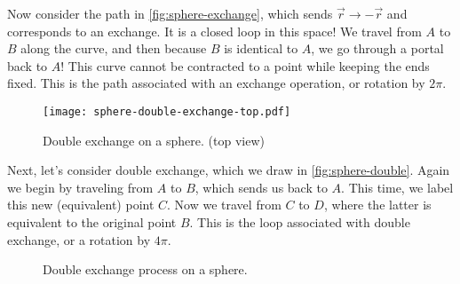 \documentclass[12pt, english]{book}
\begin{document}
Now consider the path in \autoref{fig:sphere-exchange}, which sends $\vec{r} \rightarrow -\vec{r}$ and corresponds to an exchange.
It is a closed loop in this space!
We travel from $A$ to $B$ along the curve, and then because $B$ is identical to $A$, we go through a portal back to $A$! 
This curve cannot be contracted to a point while keeping the ends fixed.
This is the path associated with an exchange operation, or rotation by $2\pi$.

\begin{figure}[!ht]
	\centering 
	\texttt{[image: sphere-double-exchange-top.pdf]}
	\caption{Double exchange on a sphere. (top view)}
	\label{fig:sphere-double}
\end{figure}

Next, let's consider double exchange, which we draw in \autoref{fig:sphere-double}. 
Again we begin by traveling from $A$ to $B$, which sends us back to $A$.
This time, we label this new (equivalent) point $C$.
Now we travel from $C$ to $D$, where the latter is equivalent to the original point $B$. 
This is the loop associated with double exchange, or a rotation by $4\pi$.

\begin{figure}[!ht]
	\centering 
	 \hfill
	 \hfill
	 \hfill
	\caption{Double exchange process on a sphere.}
	\label{fig:sphere-double2}
\end{figure}
\end{document}
